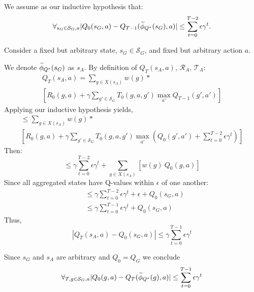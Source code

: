 We assume as our inductive hypothesis that:
\begin{equation}
\forall_{s_G \in \mathcal{S}_G, a} |Q_0(s_G, a) - Q_{T-1}(\widetilde \phi_{Q^*}(s_G), a)| \leq \sum_{t=0}^{T-2} \epsilon \gamma^t.\\
\end{equation}

Consider a fixed but arbitrary state, $s_G \in \mathcal{S}_G$, and fixed but arbitrary action $a$.

We denote $\widetilde \phi_{Q^*}(s_G)$ as $s_A$. By definition of $Q_{T}(s_A, a)$, $\mathcal{R}_A$, $\mathcal{T}_A$:
\begin{multline*}
Q_T(s_A, a) = \sum_{g \in X(s_A)}w(g)* \\ 
 \left[ R_0(g,a) + \gamma \sum_{g' \in \mathcal{S}_G} T_0(g,a,g') \max_{a'} Q_{T-1}(g', a')      \right]
\end{multline*}
Applying our inductive hypothesis yields,
\begin{multline*}
\leq \sum_{g \in X(s_A)}w(g) * \\ \left[ R_0(g,a) + \gamma \sum_{g' \in \mathcal{S}_G} T_0(g,a,g') \max_{a'}(Q_0(g', a') + \sum_{t=0}^{T-2} \epsilon \gamma^t)      \right]
\end{multline*}
Then:
\begin{equation*}
\leq \gamma\sum_{t=0}^{T-2} \epsilon \gamma^t + \sum_{g \in X(s_A)}\left[ w(g)\ Q_0(g,a)\right]
\end{equation*}
Since all aggregated states have Q-values within $\epsilon$ of one another:
\begin{align*}
&\leq \gamma\sum_{t=0}^{T-2} \epsilon \gamma^t + \epsilon + Q_0(s_G, a)\\
&\leq \gamma\sum_{t=0}^{T-1} \epsilon \gamma^t + Q_0(s_G, a)
\end{align*}
Thus,
\begin{equation*}
\left| Q_{T}(s_A, a) - Q_0(s_G,a) \right| \leq \gamma\sum_{t=0}^{T-1}\epsilon \gamma^t
\end{equation*}

Since $s_G$ and $s_A$ are arbitrary and $Q_0=Q_G$ we conclude
\begin{equation}
\forall_{T, g \in \mathcal{S}_G, a} |Q_0(g, a) - Q_T(\widetilde \phi_{Q^*}(g), a)| \leq \sum_{t=0}^{T-1} \epsilon \gamma^t
\end{equation}

